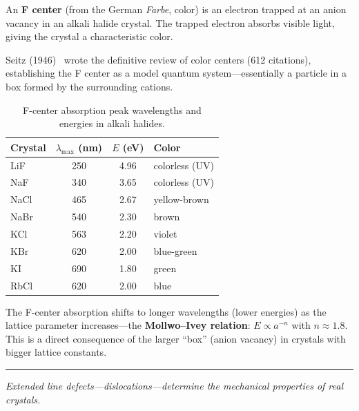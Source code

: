An \textbf{F center} (from the German \textit{Farbe}, color) is an electron trapped at an anion vacancy in an alkali halide crystal. The trapped electron absorbs visible light, giving the crystal a characteristic color.

Seitz (1946)~\cite{seitz1946fcenters} wrote the definitive review of color centers (612 citations), establishing the F center as a model quantum system---essentially a particle in a box formed by the surrounding cations.

\begin{table}[H]
\centering
\caption{F-center absorption peak wavelengths and energies in alkali halides.}
\label{tab:fcenter}
\begin{tabular}{@{}lSSl@{}}
\toprule
Crystal & {$\lambda_{\max}$ (\si{\nano\metre})} & {$E$ (\si{\electronvolt})} & Color \\
\midrule
LiF  & 250 & 4.96 & colorless (UV) \\
NaF  & 340 & 3.65 & colorless (UV) \\
NaCl & 465 & 2.67 & yellow-brown \\
NaBr & 540 & 2.30 & brown \\
KCl  & 563 & 2.20 & violet \\
KBr  & 620 & 2.00 & blue-green \\
KI   & 690 & 1.80 & green \\
RbCl & 620 & 2.00 & blue \\
\bottomrule
\end{tabular}
\end{table}

The F-center absorption shifts to longer wavelengths (lower energies) as the lattice parameter increases---the \textbf{Mollwo--Ivey relation}: $E \propto a^{-n}$ with $n \approx 1.8$. This is a direct consequence of the larger ``box'' (anion vacancy) in crystals with bigger lattice constants.

\vspace{1cm}
\noindent\rule{\textwidth}{0.4pt}
\textit{Extended line defects---dislocations---determine the mechanical properties of real crystals.}
